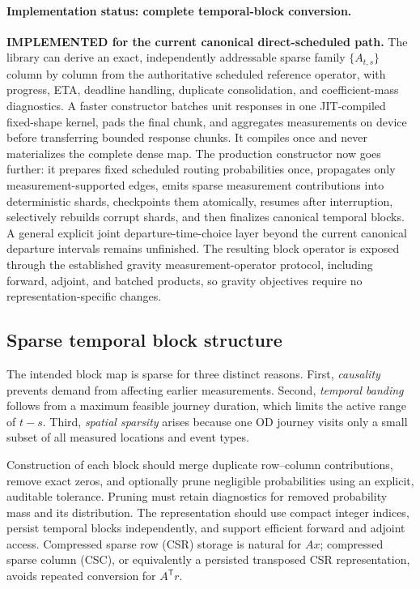 \paragraph{Implementation status: complete temporal-block conversion.}
\textbf{IMPLEMENTED for the current canonical direct-scheduled path.}  The
library can derive an exact, independently
addressable sparse family $\{A_{t,s}\}$ column by column from the authoritative
scheduled reference operator, with progress, ETA, deadline handling, duplicate
consolidation, and coefficient-mass diagnostics.  A faster constructor batches
unit responses in one JIT-compiled fixed-shape kernel, pads the final chunk, and
aggregates measurements on device before transferring bounded response chunks.
It compiles once and never materializes the complete dense map.  The production
constructor now goes further: it prepares fixed scheduled routing probabilities
once, propagates only measurement-supported edges, emits sparse measurement
contributions into deterministic shards, checkpoints them atomically, resumes
after interruption, selectively rebuilds corrupt shards, and then finalizes
canonical temporal blocks.  A general explicit joint departure-time-choice
layer beyond the current canonical departure intervals remains unfinished.
The resulting block operator is exposed through the established gravity
measurement-operator protocol, including forward, adjoint, and batched products,
so gravity objectives require no representation-specific changes.

\subsection{Sparse temporal block structure}

The intended block map is sparse for three distinct reasons.  First,
\emph{causality} prevents demand from affecting earlier measurements.  Second,
\emph{temporal banding} follows from a maximum feasible journey duration, which
limits the active range of $t-s$.  Third, \emph{spatial sparsity} arises because
one OD journey visits only a small subset of all measured locations and event
types.

Construction of each block should merge duplicate row--column contributions,
remove exact zeros, and optionally prune negligible probabilities using an
explicit, auditable tolerance.  Pruning must retain diagnostics for removed
probability mass and its distribution.  The representation should use compact
integer indices, persist temporal blocks independently, and support efficient
forward and adjoint access.  Compressed sparse row (CSR) storage is natural for
$Ax$; compressed sparse column (CSC), or equivalently a persisted transposed
CSR representation, avoids repeated conversion for $A^{\mathsf T}r$.

